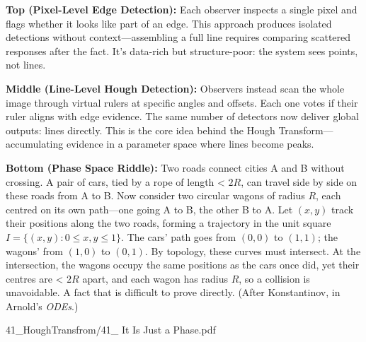 \begin{SideNotePage}{
  \textbf{Top (Pixel-Level Edge Detection):}  
  Each observer inspects a single pixel and flags whether it looks like part of an edge. This approach produces isolated detections without context—assembling a full line requires comparing scattered responses after the fact. It's data-rich but structure-poor: the system sees points, not lines. \par

  \textbf{Middle (Line-Level Hough Detection):}  
  Observers instead scan the whole image through virtual rulers at specific angles and offsets. Each one votes if their ruler aligns with edge evidence. The same number of detectors now deliver global outputs: lines directly. This is the core idea behind the Hough Transform—accumulating evidence in a parameter space where lines become peaks. \par

  \textbf{Bottom (Phase Space Riddle):}  
  Two roads connect cities A and B without crossing. A pair of cars, tied by a rope of length < $2R$, can travel side by side on these roads from A to B. Now consider two circular wagons of radius $R$, each centred on its own path—one going A to B, the other B to A. Let $(x, y)$ track their positions along the two roads, forming a trajectory in the unit square $I = \{(x, y) : 0 \leq x, y \leq 1\}$. The cars’ path goes from $(0, 0)$ to $(1, 1)$; the wagons' from $(1, 0)$ to $(0, 1)$. By topology, these curves must intersect. At the intersection, the wagons occupy the same positions as the cars once did, yet their centres are < $2R$ apart, and each wagon has radius $R$, so a collision is unavoidable. A fact that is difficult to prove directly. (After Konstantinov, in Arnold's \textit{ODEs}.) \par    
}{41_HoughTransfrom/41_ It Is Just a Phase.pdf}
\end{SideNotePage}
